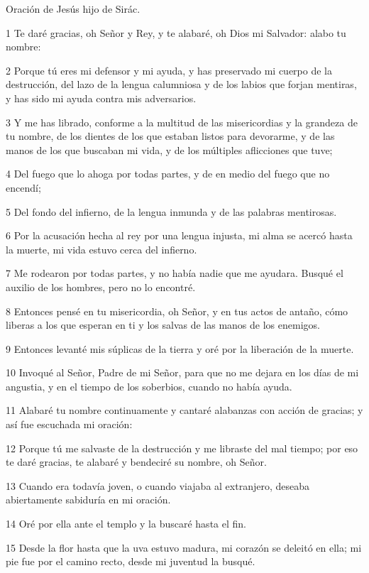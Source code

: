 \par Oración de Jesús hijo de Sirác.

\par 1 Te daré gracias, oh Señor y Rey, y te alabaré, oh Dios mi Salvador: alabo tu nombre:
\par 2 Porque tú eres mi defensor y mi ayuda, y has preservado mi cuerpo de la destrucción, del lazo de la lengua calumniosa y de los labios que forjan mentiras, y has sido mi ayuda contra mis adversarios.
\par 3 Y me has librado, conforme a la multitud de las misericordias y la grandeza de tu nombre, de los dientes de los que estaban listos para devorarme, y de las manos de los que buscaban mi vida, y de los múltiples aflicciones que tuve;
\par 4 Del fuego que lo ahoga por todas partes, y de en medio del fuego que no encendí;
\par 5 Del fondo del infierno, de la lengua inmunda y de las palabras mentirosas.
\par 6 Por la acusación hecha al rey por una lengua injusta, mi alma se acercó hasta la muerte, mi vida estuvo cerca del infierno.
\par 7 Me rodearon por todas partes, y no había nadie que me ayudara. Busqué el auxilio de los hombres, pero no lo encontré.
\par 8 Entonces pensé en tu misericordia, oh Señor, y en tus actos de antaño, cómo liberas a los que esperan en ti y los salvas de las manos de los enemigos.
\par 9 Entonces levanté mis súplicas de la tierra y oré por la liberación de la muerte.
\par 10 Invoqué al Señor, Padre de mi Señor, para que no me dejara en los días de mi angustia, y en el tiempo de los soberbios, cuando no había ayuda.
\par 11 Alabaré tu nombre continuamente y cantaré alabanzas con acción de gracias; y así fue escuchada mi oración:
\par 12 Porque tú me salvaste de la destrucción y me libraste del mal tiempo; por eso te daré gracias, te alabaré y bendeciré su nombre, oh Señor.
\par 13 Cuando era todavía joven, o cuando viajaba al extranjero, deseaba abiertamente sabiduría en mi oración.
\par 14 Oré por ella ante el templo y la buscaré hasta el fin.
\par 15 Desde la flor hasta que la uva estuvo madura, mi corazón se deleitó en ella; mi pie fue por el camino recto, desde mi juventud la busqué.
